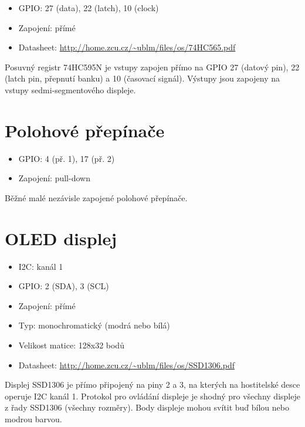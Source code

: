 \documentclass{article}
\newcommand\lang[2]{#1}
\begin{document}
\begin{itemize}
	\item GPIO: 27 (data), 22 (latch), 10 (clock)
	\item \lang{Zapojení: přímé}{Wiring: direct}
	\item Datasheet: \url{http://home.zcu.cz/~ublm/files/os/74HC565.pdf}
\end{itemize}

\lang{Posuvný registr 74HC595N je vstupy zapojen přímo na GPIO 27 (datový pin), 22 (latch pin, přepnutí banku) a 10 (časovací signál). Výstupy jsou zapojeny na vstupy sedmi-segmentového displeje.}{The shift register 74HC595N is connected to GPIO 27 (data pin), 22 (latch pin, bank shift) and 10 (timing signal). Outputs are connected to inputs of the 7-segment display.}

\section{\lang{Polohové přepínače}{Switches}}

\begin{itemize}
	\item GPIO: 4 (\lang{př.}{sw.} 1), 17 (\lang{př.}{sw.} 2)
	\item Zapojení: pull-down
\end{itemize}

\lang{Běžné malé nezávisle zapojené polohové přepínače.}{Common switches, connected independently.}

\section{OLED \lang{displej}{display}}

\begin{itemize}
	\item I2C: \lang{kanál}{channel} 1
	\item GPIO: 2 (SDA), 3 (SCL)
	\item \lang{Zapojení: přímé}{Wiring: direct}
	\item \lang{Typ: monochromatický (modrá nebo bílá)}{Type: monochromatic (blue or white)}
	\item \lang{Velikost matice: 128x32 bodů}{Matrix size: 128x32 pixels}
	\item Datasheet: \url{http://home.zcu.cz/~ublm/files/os/SSD1306.pdf}
\end{itemize}

\lang{Displej SSD1306 je přímo připojený na piny 2 a 3, na kterých na hostitelské desce operuje I2C kanál 1. Protokol pro ovládání displeje je shodný pro všechny displeje z řady SSD1306 (všechny rozměry). Body displeje mohou svítit buď bílou nebo modrou barvou.}
{The SSD1306 display is directly connected to pins 2 and 3, on which the host board operates I2C channel 1. The protocol is common for all SSD1306 displays (all variants and dimensions). Pixels glow either blue or white.}
\end{document}
